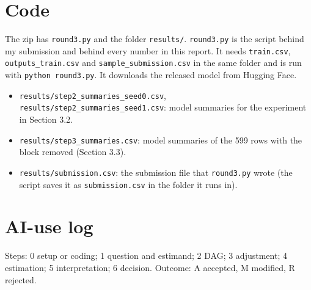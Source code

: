 \documentclass{article}
\newcommand{\code}[1]{\texttt{#1}}
\begin{document}
\appendix

\section{Code}
\label{app:code}

The zip has \code{round3.py} and the folder \code{results/}. \code{round3.py} is the script behind my
submission and behind every number in this report. It needs \code{train.csv},
\code{outputs\_train.csv} and \code{sample\_submission.csv} in the same folder and is run with
\code{python round3.py}. It downloads the released model from Hugging Face.
\begin{itemize}\setlength\itemsep{0pt}
\item \code{results/step2\_summaries\_seed0.csv}, \code{results/step2\_summaries\_seed1.csv}: model
  summaries for the experiment in Section 3.2.
\item \code{results/step3\_summaries.csv}: model summaries of the 599 rows with the block removed
  (Section 3.3).
\item \code{results/submission.csv}: the submission file that \code{round3.py} wrote (the script saves
  it as \code{submission.csv} in the folder it runs in).
\end{itemize}

\section{AI-use log}

Steps: 0 setup or coding; 1 question and estimand; 2 DAG; 3 adjustment; 4 estimation;
5 interpretation; 6 decision. Outcome: A accepted, M modified, R rejected.
\end{document}
